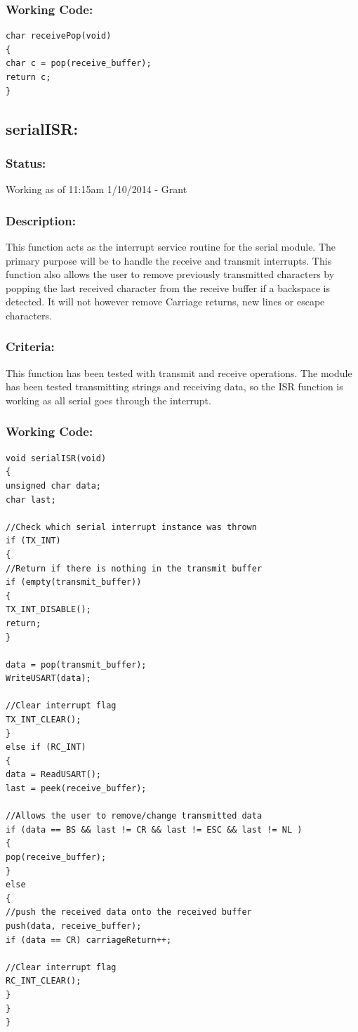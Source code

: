 \documentclass[]{report}
\begin{document}
\subsubsection{Working Code:}
\begin{lstlisting}
char receivePop(void)
{
char c = pop(receive_buffer);
return c;
}
\end{lstlisting}

\subsection{serialISR:}
\subsubsection{Status:}
Working as of 11:15am 1/10/2014 - Grant

\subsubsection{Description:}
This function acts as the interrupt service routine for the serial module. The primary purpose will be to handle the receive and transmit interrupts. This function also allows the user to remove previously transmitted characters by popping the last received character from the receive buffer if a backspace is detected. It will not however remove Carriage returns, new lines or escape characters.

\subsubsection{Criteria:}
This function has been tested with transmit and receive operations. The module has been tested transmitting strings and receiving data, so the ISR function is working as all serial goes through the interrupt.

\subsubsection{Working Code:}
\begin{lstlisting}
void serialISR(void)
{
unsigned char data;
char last;

//Check which serial interrupt instance was thrown
if (TX_INT)
{
//Return if there is nothing in the transmit buffer
if (empty(transmit_buffer))
{
TX_INT_DISABLE();
return;
}

data = pop(transmit_buffer);
WriteUSART(data);

//Clear interrupt flag
TX_INT_CLEAR();
}
else if (RC_INT)
{
data = ReadUSART();
last = peek(receive_buffer);

//Allows the user to remove/change transmitted data
if (data == BS && last != CR && last != ESC && last != NL )
{
pop(receive_buffer);
}
else
{
//push the received data onto the received buffer
push(data, receive_buffer);
if (data == CR) carriageReturn++;

//Clear interrupt flag
RC_INT_CLEAR();
}
}
}
\end{lstlisting}
\end{document}
